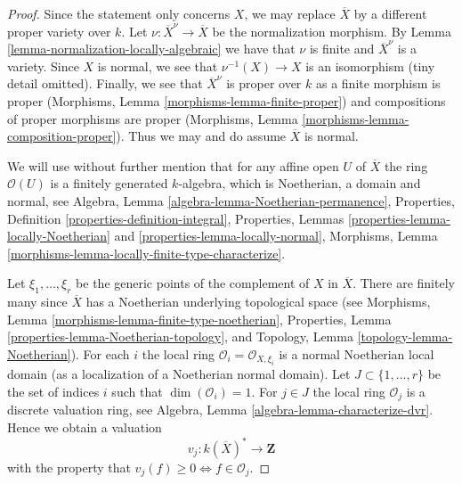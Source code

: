 \begin{proof}
Since the statement only concerns $X$, we may replace $\overline{X}$
by a different proper variety over $k$. Let $\nu : \overline{X}^\nu \to
\overline{X}$ be the normalization morphism. By
Lemma \ref{lemma-normalization-locally-algebraic}
we have that $\nu$ is finite and $\overline{X}^\nu$ is a
variety. Since $X$ is normal, we see that $\nu^{-1}(X) \to X$ is an
isomorphism (tiny detail omitted). Finally, we see that
$\overline{X}^\nu$ is proper over $k$ as a finite morphism is proper
(Morphisms, Lemma \ref{morphisms-lemma-finite-proper})
and compositions of proper morphisms
are proper (Morphisms, Lemma \ref{morphisms-lemma-composition-proper}).
Thus we may and do assume $\overline{X}$ is normal.

\medskip\noindent
We will use without further mention that for any affine open $U$ of
$\overline{X}$ the ring $\mathcal{O}(U)$ is a finitely generated
$k$-algebra, which is Noetherian, a domain and normal, see
Algebra, Lemma \ref{algebra-lemma-Noetherian-permanence},
Properties, Definition \ref{properties-definition-integral},
Properties, Lemmas \ref{properties-lemma-locally-Noetherian} and
\ref{properties-lemma-locally-normal},
Morphisms, Lemma \ref{morphisms-lemma-locally-finite-type-characterize}.

\medskip\noindent
Let $\xi_1, \ldots, \xi_r$ be the generic points of the complement of $X$
in $\overline{X}$. There are finitely many since $\overline{X}$ has a
Noetherian underlying topological space (see
Morphisms, Lemma \ref{morphisms-lemma-finite-type-noetherian},
Properties, Lemma \ref{properties-lemma-Noetherian-topology}, and
Topology, Lemma \ref{topology-lemma-Noetherian}).
For each $i$ the local ring $\mathcal{O}_i = \mathcal{O}_{X, \xi_i}$
is a normal Noetherian local domain (as a localization of a
Noetherian normal domain). Let $J \subset \{1, \ldots, r\}$ be the set of
indices $i$ such that $\dim(\mathcal{O}_i) = 1$. For $j \in J$ the
local ring $\mathcal{O}_j$ is a discrete valuation ring, see
Algebra, Lemma \ref{algebra-lemma-characterize-dvr}.
Hence we obtain a valuation
$$
v_j : k(\overline{X})^* \longrightarrow \mathbf{Z}
$$
with the property that $v_j(f) \geq 0 \Leftrightarrow f \in \mathcal{O}_j$.


\end{proof}
